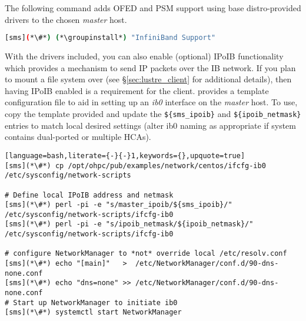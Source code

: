 The following command adds OFED and PSM support using base distro-provided drivers
to the chosen {\em master} host.

\begin{lstlisting}[language=bash,keywords={}]
[sms](*\#*) (*\groupinstall*) "InfiniBand Support"
\end{lstlisting}



With the \InfiniBand{} drivers included, you can also enable (optional) IPoIB functionality
which provides a mechanism to send IP packets over the IB network. If you plan
to mount a \Lustre{} file system over \InfiniBand{} (see \S\ref{sec:lustre_client}
for additional details), then having IPoIB enabled is a requirement for the
\Lustre{} client. \OHPC{} provides a template configuration file to aid in setting up
an {\em ib0} interface on the {\em master} host. To use, copy the template
provided and update the \texttt{\$\{sms\_ipoib\}} and
\texttt{\$\{ipoib\_netmask\}} entries to match local desired settings (alter ib0
naming as appropriate if system contains dual-ported or multiple HCAs).

\begin{lstlisting}[language=bash,literate={-}{-}1,keywords={},upquote=true]
[sms](*\#*) cp /opt/ohpc/pub/examples/network/centos/ifcfg-ib0 /etc/sysconfig/network-scripts

# Define local IPoIB address and netmask
[sms](*\#*) perl -pi -e "s/master_ipoib/${sms_ipoib}/" /etc/sysconfig/network-scripts/ifcfg-ib0
[sms](*\#*) perl -pi -e "s/ipoib_netmask/${ipoib_netmask}/" /etc/sysconfig/network-scripts/ifcfg-ib0

# configure NetworkManager to *not* override local /etc/resolv.conf
[sms](*\#*) echo "[main]"   >  /etc/NetworkManager/conf.d/90-dns-none.conf
[sms](*\#*) echo "dns=none" >> /etc/NetworkManager/conf.d/90-dns-none.conf
# Start up NetworkManager to initiate ib0
[sms](*\#*) systemctl start NetworkManager

\end{lstlisting}

